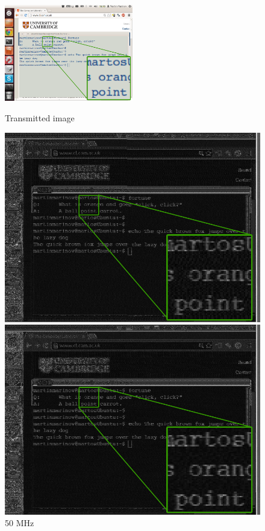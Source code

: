 \documentclass[a4paper,12pt,twoside,openright]{report}
\begin{document}
\begin{figure}[h!]
  \centering
    \includegraphics[width=0.5\textwidth]{sr_original}
  \caption{Transmitted image}
\endminipage\hfill
{}
  \centering
    \includegraphics[width=\linewidth]{sr_50MHz_at_190MHz}
  \caption{50 MHz}
\endminipage\hfill
{}
  \centering
    \includegraphics[width=\linewidth]{sr_40MHz_at_190MHz}

\end{figure}
\end{document}
